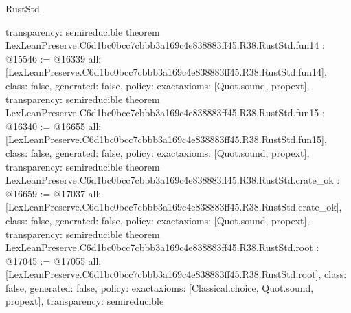 \begin{lexlean}{RustStd}
\begin{coremodule}
{  transparency: semireducible
}
theorem LexLeanPreserve.C6d1bc0bcc7cbbb3a169c4e838883ff45.R38.RustStd.fun14 : @15546 := @16339 {
  all: [LexLeanPreserve.C6d1bc0bcc7cbbb3a169c4e838883ff45.R38.RustStd.fun14],
  class: false,
  generated: false,
  policy: exact{axioms: [Quot.sound, propext]},
  transparency: semireducible
}
theorem LexLeanPreserve.C6d1bc0bcc7cbbb3a169c4e838883ff45.R38.RustStd.fun15 : @16340 := @16655 {
  all: [LexLeanPreserve.C6d1bc0bcc7cbbb3a169c4e838883ff45.R38.RustStd.fun15],
  class: false,
  generated: false,
  policy: exact{axioms: [Quot.sound, propext]},
  transparency: semireducible
}
theorem LexLeanPreserve.C6d1bc0bcc7cbbb3a169c4e838883ff45.R38.RustStd.crate_ok : @16659 := @17037 {
  all: [LexLeanPreserve.C6d1bc0bcc7cbbb3a169c4e838883ff45.R38.RustStd.crate_ok],
  class: false,
  generated: false,
  policy: exact{axioms: [Quot.sound, propext]},
  transparency: semireducible
}
theorem LexLeanPreserve.C6d1bc0bcc7cbbb3a169c4e838883ff45.R38.RustStd.root : @17045 := @17055 {
  all: [LexLeanPreserve.C6d1bc0bcc7cbbb3a169c4e838883ff45.R38.RustStd.root],
  class: false,
  generated: false,
  policy: exact{axioms: [Classical.choice, Quot.sound, propext]},
  transparency: semireducible
}


\end{coremodule}
\end{lexlean}
